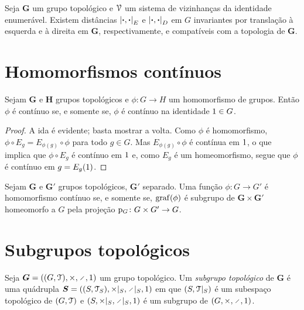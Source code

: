 \begin{proposition}
Seja $\bm G$ um grupo topológico e $\mathcal{V}$ um sistema de vizinhanças da identidade enumerável. Existem distâncias $\left\vert{\bm{\cdot}},{\bm{\cdot}}\right\vert_E$ e $\left\vert{\bm{\cdot}},{\bm{\cdot}}\right\vert_D$ em $G$ invariantes por translação à esquerda e à direita em $\bm G$, respectivamente, e compatíveis com a topologia de $\bm G$.
\end{proposition}


\section{Homomorfismos contínuos}

\begin{proposition}
Sejam $\bm G$ e $\bm H$ grupos topológicos e $\phi\colon G \to H$ um homomorfismo de grupos. Então $\phi$ é contínuo se, e somente se, $\phi$ é contínuo na identidade $1 \in G$.
\end{proposition}
\begin{proof}
A ida é evidente; basta mostrar a volta. Como $\phi$ é homomorfismo, $\phi \circ E_g = E_{\phi(g)} \circ \phi$ para todo $g \in G$. Mas $E_{\phi(g)} \circ \phi$ é contínua em $1$, o que implica que $\phi \circ E_g$ é contínuo em $1$ e, como $E_g$ é um homeomorfismo, segue que $\phi$ é contínuo em $g=E_g(1)$.
\end{proof}

\begin{proposition}
Sejam $\bm G$ e $\bm G'$ grupos topológicos, $\bm G'$ separado. Uma função $\phi\colon G \to G'$ é homomorfismo contínuo se, e somente se,
$\operatorname{graf}(\phi)$ é subgrupo de $\bm G \times \bm G'$ homeomorfo a $G$ pela projeção $\mathrm{p}_G\colon G \times G' \to G$.
\end{proposition}

\section{Subgrupos topológicos}

\begin{definition}
Seja $\bm G = ((G,\topo),\times,\div,\id)$ um grupo topológico. Um \emph{subgrupo topológico} de $\bm G$ é uma quádrupla $\bm S = ((S,\topo_S),\times|_S,\div|_S,\id)$ em que $(S,\mathcal{T}|_S)$ é um subespaço topológico de $(G,\mathcal{T})$ e $(S,\times|_S,\div|_S,\id)$ é um subgrupo de $(G,\times,\div,\id)$.
\end{definition}

